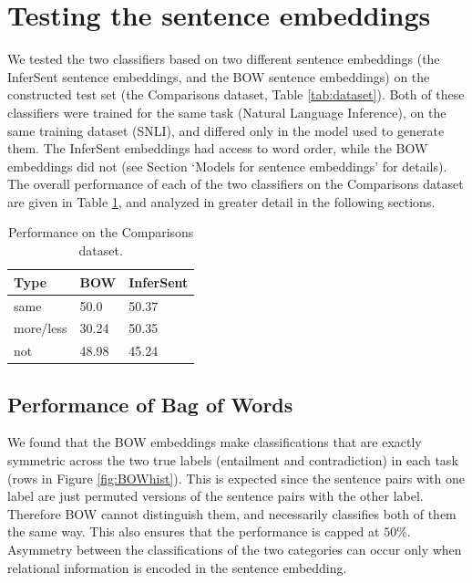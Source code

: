 \section{Testing the sentence embeddings}

We tested the two classifiers based on two different sentence embeddings (the InferSent sentence embeddings, and the BOW sentence embeddings) on the constructed test set (the Comparisons dataset, Table \ref{tab:dataset}). Both of these classifiers were trained for the same task (Natural Language Inference), on the same training dataset (SNLI), and differed only in the model used to generate them. The InferSent embeddings had access to word order, while the BOW embeddings did not (see Section `Models for sentence embeddings' for details). The overall performance of each of the two classifiers on the Comparisons dataset are given in Table \ref{tab:pretrainperf}, and analyzed in greater detail in the following sections.

\begin{table}[htb]
\begin{center}
  \begin{tabular}{p{20mm} p{20mm} p{20mm}} 
 \toprule
 Type & BOW & InferSent \\
    \midrule
same & 50.0 &50.37\\
 more/less & 30.24 &50.35\\
not & 48.98 & 45.24\\
\bottomrule
\end{tabular}
 \caption{Performance on the Comparisons dataset.}
  \label{tab:pretrainperf}
  \end{center}
\end{table}

\subsection{Performance of Bag of Words}
We found that the BOW embeddings make classifications that are exactly symmetric across the two true labels (entailment and contradiction) in each task (rows in Figure \ref{fig:BOWhist}). This is expected since the sentence pairs with one label are just permuted versions of the sentence pairs with the other label. Therefore BOW cannot distinguish them, and necessarily classifies both of them the same way. This also ensures that the performance is capped at $50\%$. Asymmetry between the classifications of the two categories can occur only when relational information is encoded in the sentence embedding.

